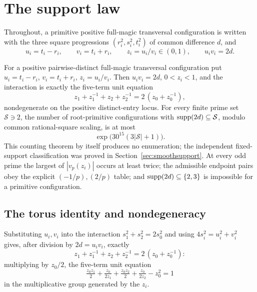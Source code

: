 \section{The support law}\label{sec:supportlaw}

Throughout, a primitive positive full-magic transversal configuration is written with the three square progressions
$(r_i^2,s_i^2,t_i^2)$ of common difference $d$, and
\[
u_i=t_i-r_i,\qquad v_i=t_i+r_i,\qquad z_i=u_i/v_i\in(0,1),
\qquad u_iv_i=2d .
\]

\begin{theorem}\label{main:supportlaw}
For a positive pairwise-distinct full-magic transversal configuration put $u_i=t_i-r_i$,
$v_i=t_i+r_i$, $z_i=u_i/v_i$. Then $u_iv_i=2d$, $0<z_i<1$, and the
interaction is exactly the five-term unit equation
\[
z_1+z_1^{-1}+z_2+z_2^{-1}=2\,(z_0+z_0^{-1}),
\]
nondegenerate on the positive distinct-entry locus. For every finite prime set
$\mathcal S\ni2$, the number of root-primitive configurations with
$\operatorname{supp}(2d)\subseteq\mathcal S$, modulo common rational-square scaling, is at
most
\[
\exp\bigl(30^{15}(3|\mathcal S|+1)\bigr).
\]
This counting theorem by itself produces no enumeration; the independent
fixed-support classification was proved in Section~\ref{sec:smoothsupport}. At every odd
prime the largest of $|v_p(z_i)|$ occurs at least twice; the admissible
endpoint pairs obey the explicit $(-1/p),(2/p)$ table; and
$\operatorname{supp}(2d)\subseteq\{2,3\}$ is impossible for a primitive configuration.
\end{theorem}

\subsection{The torus identity and nondegeneracy}

Substituting $u_i,v_i$ into the interaction $s_1^2+s_2^2=2s_0^2$ and using
$4s_i^2=u_i^2+v_i^2$ gives, after division by $2d=u_iv_i$, exactly
\[
z_1+z_1^{-1}+z_2+z_2^{-1}=2\,(z_0+z_0^{-1}) :
\tag{L.1}
\]
multiplying by $z_0/2$, the five-term unit equation
\[
\tfrac{z_0z_1}{2}+\tfrac{z_0}{2z_1}+\tfrac{z_0z_2}{2}+\tfrac{z_0}{2z_2}
-z_0^{2}=1
\tag{L.1$'$}
\]
in the multiplicative group generated by the $z_i$.

